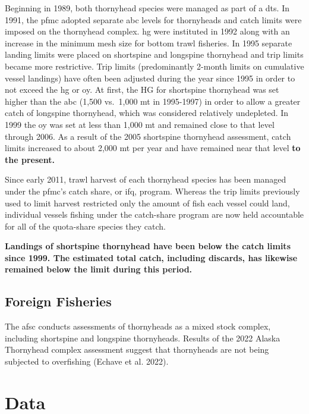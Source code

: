 \documentclass[11pt,
  english,
  letterpaper,
]{article}
\begin{document}
Beginning in 1989, both thornyhead species were managed as part of a \gls{dts}. In 1991, the \gls{pfmc} adopted separate \gls{abc} levels for thornyheads and catch limits were imposed on the thornyhead complex. \gls{hg} were instituted in 1992 along with an increase in the minimum mesh size for bottom trawl fisheries. In 1995 separate landing limits were placed on shortspine and longspine thornyhead and trip limits became more restrictive. Trip limits (predominantly 2-month limits on cumulative vessel landings) have often been adjusted during the year since 1995 in order to not exceed the \gls{hg} or \gls{oy}. At first, the HG for shortspine thornyhead was set higher than the \gls{abc} (1,500 vs.~1,000 mt in 1995-1997) in order to allow a greater catch of longspine thornyhead, which was considered relatively undepleted. In 1999 the \gls{oy} was set at less than 1,000 mt and remained close to that level through 2006. As a result of the 2005 shortspine thornyhead assessment, catch limits increased to about 2,000 mt per year and have remained near that level \textbf{to the present.}

Since early 2011, trawl harvest of each thornyhead species has been managed under the \gls{pfmc}'s catch share, or \gls{ifq}, program. Whereas the trip limits previously used to limit harvest restricted only the amount of fish each vessel could land, individual vessels fishing under the catch-share program are now held accountable for all of the quota-share species they catch.

\textbf{Landings of shortspine thornyhead have been below the catch limits since 1999. The estimated total catch, including discards, has likewise remained below the limit during this period.}

\hypertarget{foreign-fisheries}{%
\subsection{Foreign Fisheries}\label{foreign-fisheries}}

The \gls{afsc} conducts assessments of thornyheads as a mixed stock complex, including shortspine and longspine thornyheads. Results of the 2022 Alaska Thornyhead complex assessment suggest that thornyheads are not being subjected to overfishing (Echave et al. 2022).

\hypertarget{data}{%
\section{Data}\label{data}}
\end{document}
